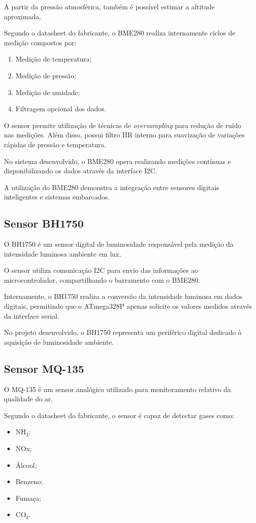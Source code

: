 \documentclass[a4paper,12pt]{article}
\begin{document}
A partir da pressão atmosférica, também é possível estimar a altitude aproximada.

Segundo o datasheet do fabricante, o BME280 realiza internamente ciclos de medição compostos por:
\begin{enumerate}
    \item Medição de temperatura;
    \item Medição de pressão;
    \item Medição de umidade;
    \item Filtragem opcional dos dados.
\end{enumerate}

O sensor permite utilização de técnicas de \textit{oversampling} para redução de ruído nas medições. Além disso, possui filtro IIR interno para suavização de variações rápidas de pressão e temperatura.

No sistema desenvolvido, o BME280 opera realizando medições contínuas e disponibilizando os dados através da interface I2C.

A utilização do BME280 demonstra a integração entre sensores digitais inteligentes e sistemas embarcados.

\subsection{Sensor BH1750}

O BH1750 é um sensor digital de luminosidade responsável pela medição da intensidade luminosa ambiente em lux.

O sensor utiliza comunicação I2C para envio das informações ao microcontrolador, compartilhando o barramento com o BME280.

Internamente, o BH1750 realiza a conversão da intensidade luminosa em dados digitais, permitindo que o ATmega328P apenas solicite os valores medidos através da interface serial.

No projeto desenvolvido, o BH1750 representa um periférico digital dedicado à aquisição de luminosidade ambiente.

\subsection{Sensor MQ-135}

O MQ-135 é um sensor analógico utilizado para monitoramento relativo da qualidade do ar.

Segundo o datasheet do fabricante, o sensor é capaz de detectar gases como:
\begin{itemize}
    \item NH$_3$;
    \item NOx;
    \item Álcool;
    \item Benzeno;
    \item Fumaça;
    \item CO$_2$.
\end{itemize}
\end{document}

